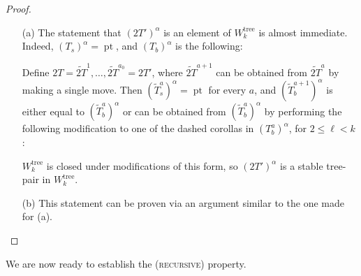 \documentclass[11pt]{amsart}
\theoremstyle{definition}
\theoremstyle{remark}
\theoremstyle{plain}
\newcommand{\on}{\operatorname}
\newcommand\pt{{\on{pt}}}
\newcommand{\tree}{{\on{tree}}}
\newcommand{\wt}{\widetilde}
\begin{document}
\begin{proof}
\begin{itemize}
\item[(a)] The statement that $(2T')^\alpha$ is an element of $W_k^\tree$ is almost immediate.
Indeed, $(T_s)^\alpha = \pt$, and $(T_b)^\alpha$ is the following:

\vspace{-0.2in}
\begin{figure}[H]
\centering
\def\svgwidth{0.04\columnwidth}

\end{figure}
\vspace{-0.15in}

\noindent Define $2T = \wt{2T}^1,\ldots,\wt{2T}^{a_0} = 2T'$, where $\wt{2T}^{a+1}$ can be obtained from $\wt{2T}^a$ by making a single move.
Then $(\wt T_s^a)^\alpha = \pt$ for every $a$, and $(\wt T_b^{a+1})^\alpha$ is either equal to $(\wt T_b^a)^\alpha$ or can be obtained from $(\wt T_b^a)^\alpha$ by performing the following modification to one of the dashed corollas in $(T_b^a)^\alpha$, for $2 \leq \ell < k$:

\vspace{-0.1in}
\begin{figure}[H]
\centering
\def\svgwidth{0.4\columnwidth}

\end{figure}
\vspace{-0.1in}

\noindent $W_k^\tree$ is closed under modifications of this form, so $(2T')^\alpha$ is a stable tree-pair in $W_k^\tree$.

\item[(b)] This statement can be proven via an argument similar to the one made for (a).
\end{itemize}
\end{proof}

We are now ready to establish the \textsc{(recursive)} property.
\end{document}
